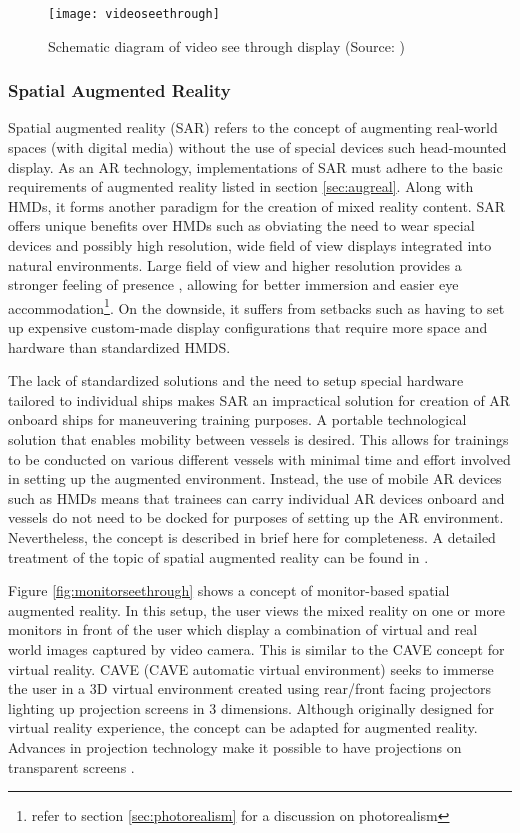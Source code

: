 \begin{figure}
	\centering
	\texttt{[image: videoseethrough]}
	\caption{Schematic diagram of video see through display (Source: \cite{azuma1997survey})}
	\label{fig:videoseethrough}
\end{figure}



\subsubsection{Spatial Augmented Reality}

Spatial augmented reality (SAR) refers to the concept of augmenting real-world spaces (with digital media) without the use of special devices such head-mounted display. As an AR technology, implementations of SAR must adhere to the basic requirements of augmented reality listed in section \ref{sec:augreal}. Along with HMDs, it forms another paradigm for the creation of mixed reality content. SAR offers unique benefits over HMDs such as obviating the need to wear special devices and possibly high resolution, wide field of view displays integrated into natural environments. Large field of view and higher resolution provides a stronger feeling of presence \parencite{lantz1996future}, allowing for better immersion and easier eye accommodation\footnote{refer to section \ref{sec:photorealism} for a discussion on photorealism}. On the downside, it suffers from setbacks such as having to set up expensive custom-made display configurations that require more space and hardware than standardized HMDS. 

The lack of standardized solutions and the need to setup special hardware tailored to individual ships makes SAR an impractical solution for creation of AR onboard ships for maneuvering training purposes. A portable technological solution that enables mobility between vessels is desired. This allows for trainings to be conducted on various different vessels with minimal time and effort involved in setting up the augmented environment. Instead, the use of mobile AR devices such as HMDs means that trainees can carry individual AR devices onboard and vessels do not need to be docked for purposes of setting up the AR environment. Nevertheless, the concept is described in brief here for completeness. A detailed treatment of the topic of spatial augmented reality can be found in \cite{bimber2005spatial}.

Figure \ref{fig:monitorseethrough} shows a concept of monitor-based spatial augmented reality. In this setup, the user views the mixed reality on one or more monitors in front of the user which display a combination of virtual and real world images captured by video camera. This is similar to the CAVE \parencite{cruz1993surround} concept for virtual reality. CAVE (CAVE automatic virtual environment) seeks to immerse the user in a 3D virtual environment created using rear/front facing projectors lighting up projection screens in 3 dimensions. Although originally designed for virtual reality experience, the concept can be adapted for augmented reality. Advances in projection technology make it possible to have projections on transparent screens \parencite{peterson2006human}. 

